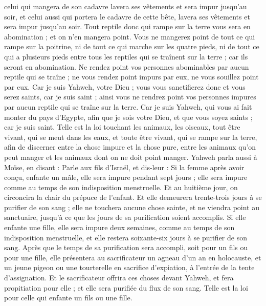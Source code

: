 \begin{multicols}{2}
celui qui mangera de son cadavre lavera ses vêtements et sera impur jusqu'au soir, et celui aussi qui portera le cadavre de cette bête, lavera ses vêtements et sera impur jusqu'au soir.
Tout reptile donc qui rampe sur la terre vous sera en abomination ; et on n'en mangera point.
Vous ne mangerez point de tout ce qui rampe sur la poitrine, ni de tout ce qui marche sur les quatre pieds, ni de tout ce qui a plusieurs pieds entre tous les reptiles qui se traînent sur la terre ; car ils seront en abomination.
Ne rendez point vos personnes abominables par aucun reptile qui se traîne ; ne vous rendez point impurs par eux, ne vous souillez point par eux.
Car je suis Yahweh, votre Dieu ; vous vous sanctifierez donc et vous serez saints, car je suis saint ; ainsi vous ne rendrez point vos personnes impures par aucun reptile qui se traîne sur la terre.
Car je suis Yahweh, qui vous ai fait monter du pays d'Egypte, afin que je sois votre Dieu, et que vous soyez saints ; car je suis saint.
Telle est la loi touchant les animaux, les oiseaux, tout être vivant, qui se meut dans les eaux, et toute être vivant, qui se rampe sur la terre,
afin de discerner entre la chose impure et la chose pure, entre les animaux qu'on peut manger et les animaux dont on ne doit point manger.
\VerseOne{}Yahweh parla aussi à Moïse, en disant :
Parle aux fils d'Israël, et dis-leur : Si la femme après avoir conçu, enfante un mâle, elle sera impure pendant sept jours ; elle sera impure comme au temps de son indisposition menstruelle.
Et au huitième jour, on circoncira la chair du prépuce de l'enfant.
Et elle demeurera trente-trois jours à se purifier de son sang ; elle ne touchera aucune chose sainte, et ne viendra point au sanctuaire, jusqu'à ce que les jours de sa purification soient accomplis.
Si elle enfante une fille, elle sera impure deux semaines, comme au temps de son indisposition menstruelle, et elle restera soixante-six jours à se purifier de son sang.
Après que le temps de sa purification sera accompli, soit pour un fils ou pour une fille, elle présentera au sacrificateur un agneau d'un an en holocauste, et un jeune pigeon ou une tourterelle en sacrifice d’expiation, à l'entrée de la tente d'assignation.
Et le sacrificateur offrira ces choses devant Yahweh, et fera propitiation pour elle ; et elle sera purifiée du flux de son sang. Telle est la loi pour celle qui enfante un fils ou une fille.

\end{multicols}
